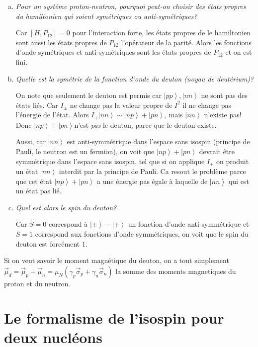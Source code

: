 \documentclass[10pt]{report}
\newcommand{\ket}[1]{\left|#1\right>}
\begin{document}
\begin{enumerate}[a)]
    \item \emph{Pour un syst\'eme proton-neutron, pourquoi peut-on choisir des \'etats propres du hamiltonien qui soient sym\'etriques ou anti-sym\'etriques?}

        Car $[H, P_{12}] = 0$ pour l'interaction forte, les \'etats propres de le hamiltonien sont aussi les \'etats propres de $P_{12}$ l'op\'erateur de la parit\'e. Alors les fonctions d'onde sym\'etriques et anti-sym\'etriques sont les \'etats propres de $P_{12}$ et on est fini.

    \item \emph{Quelle est la sym\'etrie de la fonction d'onde du deuton (noyau de deut\'erium)?}

        On note que seulement le deuton est permis car $\ket{pp}, \ket{nn}$ ne sont pas des \'etats li\'es. Car $I_{\pm}$ ne change pas la valeur propre de $I^2$ il ne change pas l'\'energie de l'\'etat. Alors $I_+\ket{nn} \sim \ket{np} + \ket{pn}$, mais $\ket{nn}$ n'existe pas! Donc $\ket{np} + \ket{pn}$n'est \emph{pas} le deuton, parce que le deuton existe.

        Aussi, car $\ket{nn}$ est anti-symm\'etrique dans l'espace sans isospin (principe de Pauli, le neutron est un fermion), on voit que $\ket{np} + \ket{pn}$ devrait \^etre symm\'etrique dans l'espace sans isospin, tel que si on applique $I_+$ on produit un \'etat $\ket{nn}$ interdit par la principe de Pauli. Ca resout le probl\`eme parce que cet \'etat $\ket{np} + \ket{pn}$ a une \'energie pas \'egale \`a laquelle de $\ket{nn}$ qui est un \'etat pas li\'e.

    \item \emph{Quel est alors le spin du deuton?}

        Car $S=0$ correspond \`a $\ket{\pm} - \ket{\mp}$ un fonction d'onde anti-symm\'etrique et $S=1$ correspond aux fonctions d'onde symm\'etriques, on voit que le spin du deuton est forc\'ement $1$. 
\end{enumerate}

Si on veut savoir le moment magn\'etique du deuton, on a tout simplement $\vec{\mu}_d = \vec{\mu}_p + \vec{\mu}_n = \mu_N\left( \gamma_p \vec{\sigma}_p + \gamma_n\vec{\sigma}_n \right)$ la somme des moments magnetiques du proton et du neutron. 

\section{Le formalisme de l'isospin pour deux nucl\'eons}
\end{document}
